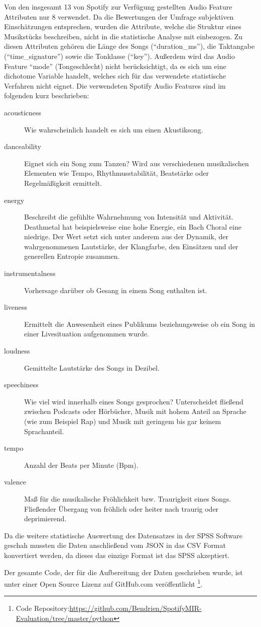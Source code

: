 Von den insgesamt 13 von Spotify zur Verfügung gestellten Audio Feature Attributen nur 8 verwendet.
Da die Bewertungen der Umfrage subjektiven Einschätzungen entsprechen, wurden die Attribute, welche die Struktur eines Musikstücks beschreiben, nicht in die statistische Analyse mit einbezogen.
Zu diesen Attributen gehören die Länge des Songs ("`duration\_ms"'),  die Taktangabe ("`time\_signature"') sowie die Tonklasse ("`key"').
Außerdem wird das Audio Feature "`mode"' (Tongeschlecht) nicht berücksichtigt, da es sich um eine dichotome Variable handelt, welches sich für das verwendete statistische Verfahren nicht eignet.
Die verwendeten Spotify Audio Features sind im folgenden kurz beschrieben:

\begin{description}
    \item[acousticness]
        Wie wahrscheinlich handelt es sich um einen Akustiksong.
    \item[danceability]
        Eignet sich ein Song zum Tanzen?
        Wird aus verschiedenen musikalischen Elementen wie Tempo, Rhythmusstabilität, Beatstärke oder Regelmäßigkeit ermittelt.
    \item[energy]
        Beschreibt die gefühlte Wahrnehmung von Intensität und Aktivität.
        Deathmetal hat beispielsweise eine hohe Energie, ein Bach Choral eine niedrige. Der Wert setzt sich unter anderem aus der Dynamik, der wahrgenommenen Lautstärke, der Klangfarbe, den Einsätzen und der generellen Entropie zusammen.
    \item[instrumentalness]
        Vorhersage darüber ob Gesang in einem Song enthalten ist.
    \item[liveness]
        Ermittelt die Anwesenheit eines Publikums beziehungsweise ob ein Song in einer Livesituation aufgenommen wurde.
    \item[loudness]
        Gemittelte Lautstärke des Songs in Dezibel.
    \item[speechiness]
        Wie viel wird innerhalb eines Songs gesprochen?
        Unterscheidet fließend zwischen Podcasts oder Hörbücher, Musik mit hohem Anteil an Sprache (wie zum Beispiel Rap) und Musik mit geringem bis gar keinem Sprachanteil.
    \item[tempo]
        Anzahl der Beats per Minute (Bpm).
    \item[valence]
        Maß für die musikalische Fröhlichkeit bzw. Traurigkeit eines Songs.
        Fließender Übergang von fröhlich oder heiter nach traurig oder deprimierend.
\end{description}

Da die weitere statistische Auswertung des Datensatzes in der SPSS Software geschah mussten die Daten anschließend vom JSON in das CSV Format konvertiert werden, da dieses das einzige Format ist das SPSS akzeptiert.

Der gesamte Code, der für die Aufbereitung der Daten geschrieben wurde, ist unter einer Open Source Lizenz auf GitHub.com veröffentlicht \footnote{Code Repository:\hfill \url{https://github.com/Bendrien/SpotifyMIR-Evaluation/tree/master/python}}.

